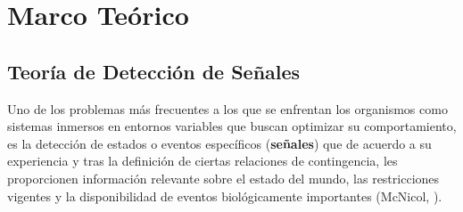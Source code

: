 \chapter{Marco Teórico} %

\label{Cap_SDT} %


\newcommand{\keyword}[1]{\textbf{#1}}
\newcommand{\tabhead}[1]{\textbf{#1}}
\newcommand{\code}[1]{\texttt{#1}}
\newcommand{\file}[1]{\texttt{\bfseries#1}}
\newcommand{\option}[1]{\texttt{\itshape#1}}


\section{Teoría de Detección de Señales}

Uno de los problemas más frecuentes a los que se enfrentan los organismos como sistemas inmersos en entornos variables que buscan optimizar su comportamiento, es la detección de estados o eventos específicos (\textbf{señales}) que de acuerdo a su experiencia y tras la definición de ciertas relaciones de contingencia, les proporcionen información relevante sobre el estado del mundo, las restricciones vigentes y la disponibilidad de eventos biológicamente importantes (McNicol, \citeyear{McNicol1}).\\

